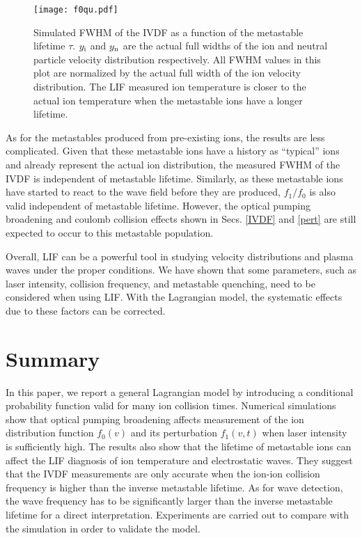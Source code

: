 \documentclass[aip,pop,reprint]{revtex4-1}
\begin{document}
\begin{figure}
\begin{center}
\texttt{[image: f0qu.pdf]}
\caption{Simulated FWHM of the IVDF as a function of the metastable lifetime $\tau$. $y_\textup{i}$ and $y_\textup{n}$ are the actual full widths of the ion and neutral particle velocity distribution respectively. All FWHM values in this plot are normalized by the actual full width of the ion velocity distribution. The LIF measured ion temperature is closer to the actual ion temperature when the metastable ions have a longer lifetime.}
\label{fig:f0qu}
\end{center}
\end{figure}

As for the metastables produced from pre-existing ions, the results are less complicated. Given that these metastable ions have a history as ``typical'' ions and already represent the actual ion distribution, the measured FWHM of the IVDF is independent of metastable lifetime. Similarly, as these metastable ions have started to react to the wave field before they are produced, $f_1/f_0$ is also valid independent of metastable lifetime. However, the optical pumping broadening and coulomb collision effects shown in Secs. \ref{IVDF} and \ref{pert} are still expected to occur to this metastable population.

Overall, LIF can be a powerful tool in studying velocity distributions and plasma waves under the proper conditions. We have shown that some parameters, such as laser intensity, collision frequency, and metastable quenching, need to be considered when using LIF. With the Lagrangian model, the systematic effects due to these factors can be corrected.

\section{Summary}
\label{sec:summary}

In this paper, we report a general Lagrangian model by introducing a conditional probability function valid for many ion collision times. Numerical simulations show that optical pumping broadening affects measurement of the ion distribution function $f_0(v)$ and its perturbation $f_1(v,t)$ when laser intensity is sufficiently high. The results also show that the lifetime of metastable ions can affect the LIF diagnosis of ion temperature and electrostatic waves. They suggest that the IVDF measurements are only accurate when the ion-ion collision frequency is higher than the inverse metastable lifetime. As for wave detection, the wave frequency has to be significantly larger than the inverse metastable lifetime for a direct interpretation. Experiments are carried out to compare with the simulation in order to validate the model.
\end{document}
